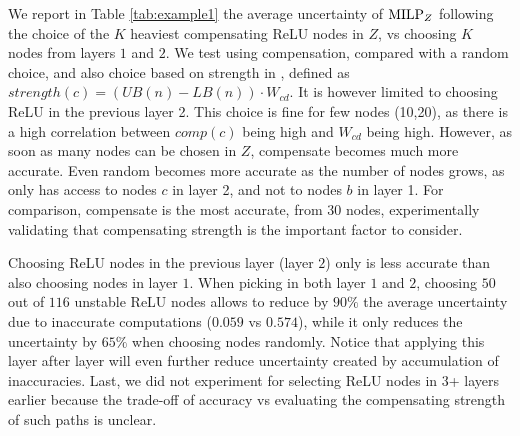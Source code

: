 We report in Table \ref{tab:example1} the average uncertainty of ${\textrm{MILP}}_Z$ following the choice of the $K$ heaviest compensating ReLU nodes in $Z$, vs choosing $K$ nodes from layers $1$ and $2$. We test using compensation, compared with a random choice, and also choice based on strength in \cite{ DivideAndSlide}, defined as $strength(c) = (UB(n)-LB(n))\cdot W_{cd}$. It is however limited to choosing ReLU in the previous layer 2. This choice is fine for few nodes (10,20), as there is a high correlation between $comp(c)$ being high and $W_{cd}$ being high. However, as soon as many nodes can be chosen in $Z$, compensate becomes much more accurate. Even random becomes more accurate as the number of nodes grows, as \cite{ DivideAndSlide} only has access to nodes $c$ in layer 2, and not to nodes $b$ in layer 1.
For comparison, compensate is the most accurate, from 30 nodes, experimentally validating that compensating strength is the important factor to consider. 

\iffalse
Choosing ReLU nodes in the previous layer (layer $2$) only is less accurate than 
also choosing nodes in layer $1$. When picking in both layer $1$ and $2$, choosing $50$ out of $116$ unstable ReLU nodes allows to reduce by $90\%$ the average uncertainty due to inaccurate computations ($0.059$ vs $0.574$), while it only reduces the uncertainty by $65\%$ when choosing nodes randomly. Notice that applying this layer after layer will even further reduce uncertainty created by accumulation of inaccuracies. 
Last, we did not experiment for selecting ReLU nodes in 3+ layers earlier because the trade-off of accuracy vs evaluating the compensating strength of such paths is unclear.

